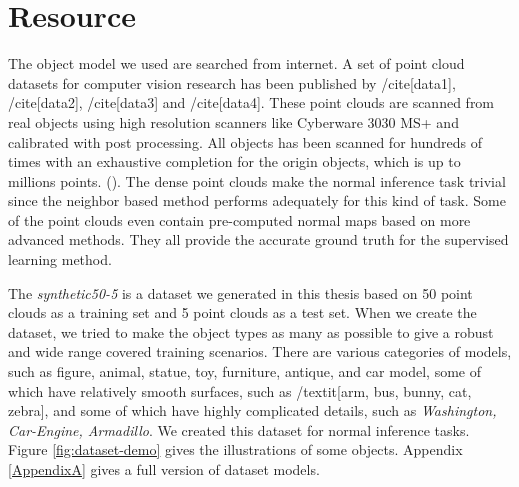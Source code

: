 \section{Resource}
The object model we used are searched from internet.
A set of point cloud datasets for computer vision research has been published by /cite[data1], /cite[data2], /cite[data3] and /cite[data4]. These point clouds are scanned from real objects using high resolution scanners like Cyberware 3030 MS+ and calibrated with post processing. All objects has been scanned for hundreds of times with an exhaustive completion for the origin objects, which is up to millions points. (\cite{data1}). The dense point clouds make the normal inference task trivial since the neighbor based method performs adequately for this kind of task. Some of the point clouds even contain pre-computed normal maps based on more advanced methods. They all provide the accurate ground truth for the supervised learning method.

The \textit{synthetic50-5} is a dataset we generated in this thesis based on 50 point clouds as a training set and 5 point clouds as a test set. When we create the dataset, we tried to make the object types as many as possible to give a robust and wide range covered training scenarios. There are various categories of models, such as figure, animal, statue, toy, furniture, antique, and car model, some of which have relatively smooth surfaces, such as /textit[arm, bus, bunny, cat, zebra], and some of which have highly complicated details, such as \textit{Washington, Car-Engine, Armadillo}. 
We created this dataset for normal inference tasks. Figure \ref{fig:dataset-demo} gives the illustrations of some objects. Appendix \ref{AppendixA} gives a full version of dataset models.

